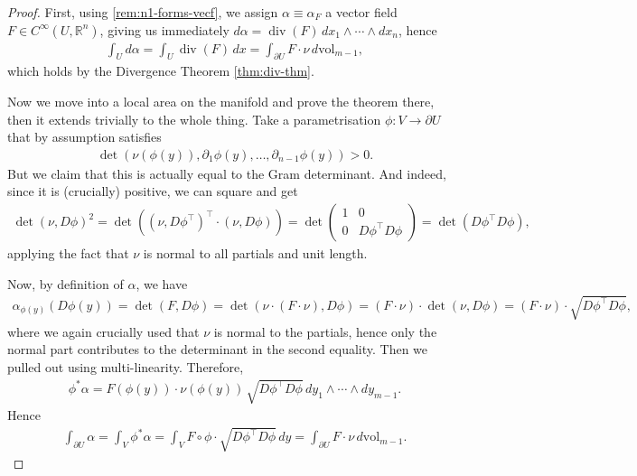 \begin{proof}
	First, using \ref{rem:n1-forms-vecf}, we assign $\alpha \equiv \alpha_{F}$ a vector field $F \in C^{\infty}(U, \mathbb{R}^{n})$, giving us immediately $d\alpha = \operatorname{div}(F) \, d x_{1} \wedge \cdots \wedge dx_{n}$, hence
	\begin{align*}
		\int_{U} d\alpha = \int_{U} \operatorname{div}(F) \, dx = \int_{\partial U} F \cdot \nu \, d \text{vol}_{m-1},
	\end{align*}
	which holds by the Divergence Theorem \ref{thm:div-thm}.

	Now we move into a local area on the manifold and prove the theorem there, then it extends trivially to the whole thing. Take a parametrisation $\phi: V \to \partial U$ that by assumption satisfies
	\begin{align*}
		\det (\nu(\phi(y)), \partial_{1} \phi(y), \dots, \partial_{n-1} \phi(y)) > 0.
	\end{align*}
	But we claim that this is actually equal to the Gram determinant. And indeed, since it is (crucially) positive, we can square and get
	\begin{align*}
		\det (\nu, D \phi)^{2} = \det ((\nu, D\phi^\top )^\top \cdot (\nu, D\phi)) = \det
		\begin{pmatrix}
			1 & 0                \\
			0 & D\phi^\top D\phi
		\end{pmatrix}
		= \det (D\phi^\top D\phi),
	\end{align*}
	applying the fact that $\nu$ is normal to all partials and unit length.

	Now, by definition of $\alpha $, we have
	\begin{align*}
		\alpha_{\phi(y)}(D\phi(y)) = \det (F, D \phi) = \det (\nu \cdot (F \cdot \nu), D\phi) = (F \cdot \nu) \cdot \det (\nu, D\phi) = (F \cdot \nu) \cdot \sqrt{D\phi^\top D\phi},
	\end{align*}
	where we again crucially used that $\nu$ is normal to the partials, hence only the normal part contributes to the determinant in the second equality. Then we pulled out using multi-linearity. Therefore,
	\begin{align*}
		\phi^* \alpha = F(\phi(y)) \cdot \nu(\phi(y)) \, \sqrt{D\phi^\top D\phi} \, dy_{1} \wedge \cdots \wedge dy_{m-1}.
	\end{align*}
	Hence
	\begin{align*}
		\int_{\partial U} \alpha = \int_{V} \phi^* \alpha  = \int_{V} F \circ \phi \cdot  \sqrt{D\phi^\top D\phi} \, dy = \int_{\partial U} F \cdot \nu \, d \text{vol}_{m-1}.
	\end{align*}
\end{proof}

